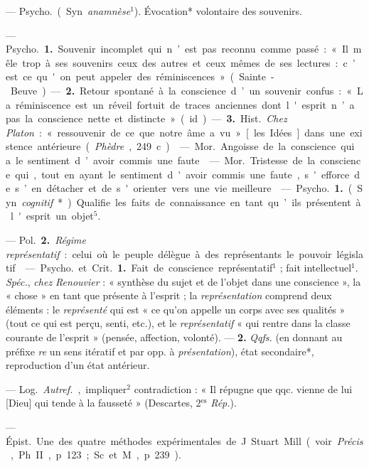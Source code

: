 \begin{itemize}[leftmargin=1cm, label=, itemsep=1pt]
 — \si{Psycho.} (Syn. {\it anamnèse}$^1$). Évocation*
volontaire des souvenirs.

 — \si{Psycho.} {\bf 1.} Souvenir incomplet qui n’est pas
reconnu comme passé : « Il mêle trop à ses souvenirs ceux des autres et ceux
mêmes de ses lectures : c’est ce qu'on peut appeler des réminiscences
» (Sainte-Beuve). — {\bf 2.} Retour spontané à la conscience d’un souvenir
confus : « La réminiscence est un réveil fortuit de traces anciennes dont
l'esprit n’a pas la conscience nette et distincte » (id.).

— {\bf 3.} \si{Hist.} {\it Chez Platon} : « ressouvenir de ce que notre âme a
vu » [les Idées] dans une existence antérieure ({\it Phèdre}, 249 c).

 — \si{Mor.} Angoisse de la conscience qui a le sentiment d’avoir
commis une faute.

 — \si{Mor.} Tristesse de la conscience qui, tout en ayant le
sentiment d'avoir commis une faute, s'efforce de s’en détacher et de
s'orienter vers une vie meilleure.

 — \si{Psycho.} {\bf 1.} (Syn. {\it cognitif}*). Qualifie
les faits de connaissance en tant qu’ils présentent à l'esprit un objet$^5$.

— \si{Pol.} {\bf 2.} {\it Régime représentatif} : celui où le peuple délègue
à des représentants le pouvoir législatif.

 — \si{Psycho.} et \si{Crit.} {\bf 1.} Fait de conscience
représentatif$^1$ ; fait intellectuel$^1$. {\it Spéc.}, {\it chez Renouvier} :
« synthèse du sujet et de l’objet dans une conscience », la « chose » en tant
que présente à l'esprit ; la {\it représentation} comprend deux éléments : le
{\it représenté} qui est « ce qu’on appelle un corps avec ses qualités
» (tout ce qui est perçu, senti, etc.), et le {\it représentatif} « qui
rentre dans la classe courante de l'esprit » (pensée, affection, volonté). —
{\bf 2.} {\it Qqfs.} (en donnant au préfixe {\it re} un sens itératif et par
opp. à {\it présentation}), état secondaire*, reproduction d’un état
antérieur.

 — \si{Log.} {\it Autref.}, impliquer$^2$ contradiction : « Il
répugne que qqc. vienne de lui [Dieu] qui tende à la fausseté » (Descartes,
2$^\text{es}$ {\it Rép.}).

 — \si{Épist.} Une des quatre méthodes
expérimentales de J. Stuart Mill (voir {\it Précis}, Ph. II, p. 123; Sc. et
M., p. 239).


\end{itemize}
